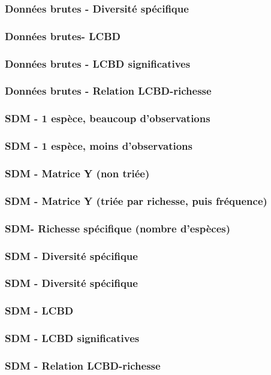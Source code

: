 \documentclass[10pt]{beamer}
\begin{document}
\begin{frame}
  \frametitle{Données brutes - Diversité spécifique}
\end{frame}

\begin{frame}
  \frametitle{Données brutes- LCBD}
\end{frame}

\begin{frame}
  \frametitle{Données brutes - LCBD significatives}
\end{frame}

\begin{frame}
  \frametitle{Données brutes - Relation LCBD-richesse}
\end{frame}


\begin{frame}
  \frametitle{SDM - 1 espèce, beaucoup d'observations}
\end{frame}

\begin{frame}
  \frametitle{SDM - 1 espèce, moins d'observations}
\end{frame}

\begin{frame}
  \frametitle{SDM - Matrice Y (non triée)}
\end{frame}

\begin{frame}
  \frametitle{SDM - Matrice Y (triée par richesse, puis fréquence)}
\end{frame}

\begin{frame}
  \frametitle{SDM- Richesse spécifique (nombre d'espèces)}
\end{frame}

\begin{frame}
  \frametitle{SDM - Diversité spécifique}
\end{frame}

\begin{frame}
  \frametitle{SDM - Diversité spécifique}
\end{frame}

\begin{frame}
  \frametitle{SDM - LCBD}
\end{frame}

\begin{frame}
  \frametitle{SDM - LCBD significatives}
\end{frame}

\begin{frame}
  \frametitle{SDM - Relation LCBD-richesse}
\end{frame}
\end{document}
